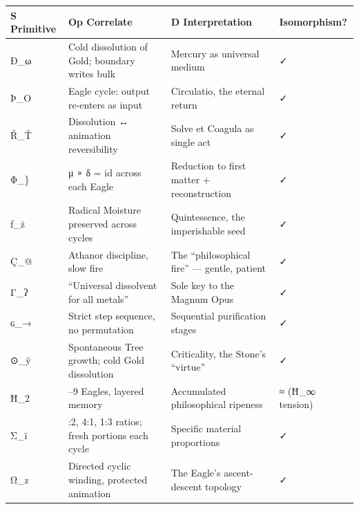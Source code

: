 \documentclass[
  11pt,
  a4paper,
]{article}
\newcounter{none} %
\begin{document}
{\def\LTcaptype{none} %
\begin{longtable}[]{@{}
  >{\raggedright\arraybackslash}p{}
  >{\raggedright\arraybackslash}p{}
  >{\raggedright\arraybackslash}p{}
  >{\raggedright\arraybackslash}p{}@{}}
\toprule\noalign{}
\begin{minipage}[b]{\linewidth}\raggedright
S Primitive
\end{minipage} & \begin{minipage}[b]{\linewidth}\raggedright
Op Correlate
\end{minipage} & \begin{minipage}[b]{\linewidth}\raggedright
D Interpretation
\end{minipage} & \begin{minipage}[b]{\linewidth}\raggedright
Isomorphism?
\end{minipage} \\
\midrule\noalign{}
\endhead
\bottomrule\noalign{}
\endlastfoot
Ð\_ω & Cold dissolution of Gold; boundary writes bulk & Mercury as
universal medium & ✓ \\
Þ\_O & Eagle cycle: output re-enters as input & Circulatio, the eternal
return & ✓ \\
Ř\_Ť & Dissolution ↔ animation reversibility & Solve et Coagula as
single act & ✓ \\
Φ\_\} & μ ∘ δ = id across each Eagle & Reduction to first matter +
reconstruction & ✓ \\
ƒ\_ż & Radical Moisture preserved across cycles & Quintessence, the
imperishable seed & ✓ \\
Ç\_@ & Athanor discipline, slow fire & The ``philosophical fire'' ---
gentle, patient & ✓ \\
Γ\_ʔ & ``Universal dissolvent for all metals'' & Sole key to the Magnum
Opus & ✓ \\
ɢ\_→ & Strict step sequence, no permutation & Sequential purification
stages & ✓ \\
⊙\_ÿ & Spontaneous Tree growth; cold Gold dissolution & Criticality, the
Stone's ``virtue'' & ✓ \\
Ħ\_2 & 7--9 Eagles, layered memory & Accumulated philosophical ripeness
& ≈ (Ħ\_∞ tension) \\
Σ\_ï & 1:2, 4:1, 1:3 ratios; fresh portions each cycle & Specific
material proportions & ✓ \\
Ω\_z & Directed cyclic winding, protected animation & The Eagle's
ascent-descent topology & ✓ \\
\end{longtable}
}
\end{document}
